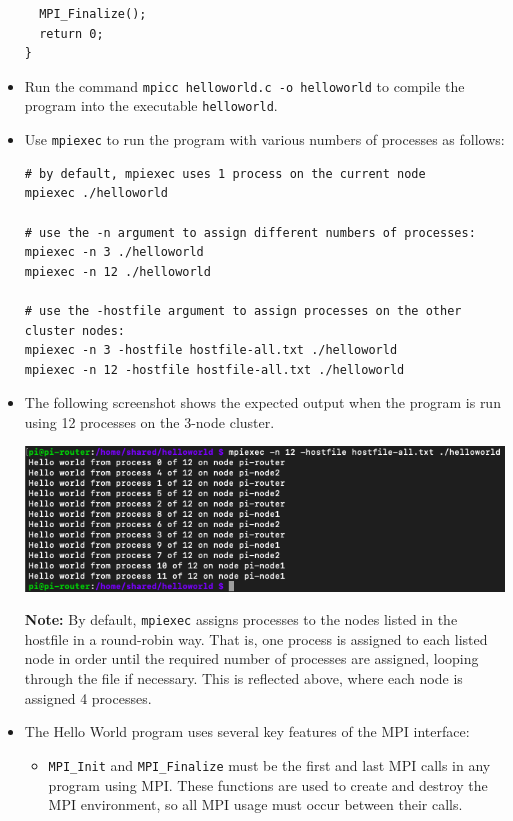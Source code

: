 \documentclass{article}
\begin{document}
\begin{itemize}
\begin{verbatim}
  MPI_Finalize();
  return 0;
}
\end{verbatim}

\item Run the command \texttt{mpicc helloworld.c -o helloworld} to compile the program into the executable \texttt{helloworld}.

\item Use \texttt{mpiexec} to run the program with various numbers of processes as follows:

\begin{verbatim}
# by default, mpiexec uses 1 process on the current node
mpiexec ./helloworld

# use the -n argument to assign different numbers of processes:
mpiexec -n 3 ./helloworld
mpiexec -n 12 ./helloworld

# use the -hostfile argument to assign processes on the other cluster nodes:
mpiexec -n 3 -hostfile hostfile-all.txt ./helloworld
mpiexec -n 12 -hostfile hostfile-all.txt ./helloworld
\end{verbatim}

\item The following screenshot shows the expected output when the program is run using 12 processes on the 3-node cluster. 

\includegraphics[width=\textwidth]{images/helloworld-output.png}

\textbf{Note:} By default, \texttt{mpiexec} assigns processes to the nodes listed in the hostfile in a round-robin way. That is, one process is assigned to each listed node in order until the required number of processes are assigned, looping through the file if necessary. This is reflected above, where each node is assigned 4 processes.

\item The Hello World program uses several key features of the MPI interface:
    \begin{itemize}
        \item \texttt{MPI\_Init} and \texttt{MPI\_Finalize} must be the first and last MPI calls in any program using MPI. These functions are used to create and destroy the MPI environment, so all MPI usage must occur between their calls.
        

\end{itemize}
\end{itemize}
\end{document}
